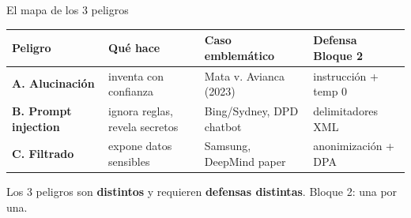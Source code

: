 \documentclass[aspectratio=169, 11pt]{beamer}
\begin{document}
\begin{frame}[shrink]{El mapa de los 3 peligros}
  \vspace{4pt}
  \begin{center}
  \begin{tabular}{p{2.4cm} p{4.2cm} p{4.0cm} p{2.6cm}}
    \toprule
    \footnotesize\textbf{Peligro} & \footnotesize\textbf{Qué hace} & \footnotesize\textbf{Caso emblemático} & \footnotesize\textbf{Defensa Bloque 2}\\
    \midrule
    \scriptsize\textbf{A. Alucinación} & \scriptsize inventa con confianza & \scriptsize Mata v. Avianca (2023) & \scriptsize instrucción + temp 0\\
    \scriptsize\textbf{B. Prompt injection} & \scriptsize ignora reglas, revela secretos & \scriptsize Bing/Sydney, DPD chatbot & \scriptsize delimitadores XML\\
    \scriptsize\textbf{C. Filtrado} & \scriptsize expone datos sensibles & \scriptsize Samsung, DeepMind paper & \scriptsize anonimización + DPA\\
    \bottomrule
  \end{tabular}
  \end{center}
  \vspace{10pt}
  \begin{tcolorbox}[colback=arcaGray, colframe=arcaRed, leftrule=3pt,
    boxrule=0pt, sharp corners, left=8pt, right=8pt, top=4pt, bottom=4pt]
    {\footnotesize\color{arcaDark}
    Los 3 peligros son \textbf{distintos} y requieren \textbf{defensas distintas}.
    Bloque 2: una por una.}
  \end{tcolorbox}
\end{frame}
\end{document}
